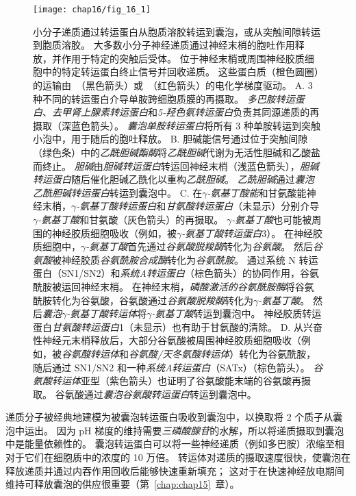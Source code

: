 \begin{figure}[htbp]
	\centering
	\texttt{[image: chap16/fig\_16\_1]}
	\caption{小分子递质通过转运蛋白从胞质溶胶转运到囊泡，或从突触间隙转运到胞质溶胶。
		大多数小分子神经递质通过神经末梢的胞吐作用释放，并作用于特定的突触后受体。
		位于神经末梢或周围神经胶质细胞中的特定转运蛋白终止信号并回收递质。
		这些蛋白质（橙色圆圈）的运输由~（黑色箭头）或~（红色箭头）的电化学梯度驱动\cite{chaudhry2008pharmacology}。
		A. 3 种不同的转运蛋白介导单胺跨细胞质膜的再摄取。
		\textit{多巴胺转运蛋白}、\textit{去甲肾上腺素转运蛋白}和\textit{5-羟色氨转运蛋白}负责其同源递质的再摄取（深蓝色箭头）。
		\textit{囊泡单胺转运蛋白}将所有 3 种单胺转运到突触小泡中，用于随后的胞吐释放。
		B. 胆碱能信号通过位于突触间隙（绿色条）中的\textit{乙酰胆碱酯酶}将\textit{乙酰胆碱}代谢为无活性胆碱和乙酸盐而终止。
		\textit{胆碱}由\textit{胆碱转运蛋白}转运回神经末梢（浅蓝色箭头），\textit{胆碱转运蛋白}随后催化胆碱乙酰化以重构\textit{乙酰胆碱}。
		\textit{乙酰胆碱}通过\textit{囊泡乙酰胆碱转运蛋白}转运到囊泡中。
		C. 在\textit{$\gamma$-氨基丁酸能}和甘氨酸能神经末梢，\textit{$\gamma$-氨基丁酸转运蛋白}和\textit{甘氨酸转运蛋白}（未显示）分别介导\textit{$\gamma$-氨基丁酸}和甘氨酸（灰色箭头）的再摄取。
		\textit{$\gamma$-氨基丁酸}也可能被周围的神经胶质细胞吸收（例如，被\textit{$\gamma$-氨基丁酸转运蛋白}3）。
		在神经胶质细胞中，\textit{$\gamma$-氨基丁酸}首先通过\textit{谷氨酸脱羧酶}转化为\textit{谷氨酸}。
		然后\textit{谷氨酸}被神经胶质\textit{谷氨酰胺合成酶}转化为\textit{谷氨酰胺}。
		通过系统 N 转运蛋白（SN1/SN2）和\textit{系统A转运蛋白}（棕色箭头）的协同作用，谷氨酰胺被运回神经末梢。
		在神经末梢，\textit{磷酸激活的谷氨酰胺酶}将谷氨酰胺转化为谷氨酸，谷氨酸通过\textit{谷氨酸脱羧酶}转化为\textit{$\gamma$-氨基丁酸}。
		然后\textit{囊泡$\gamma$-氨基丁酸转运体}将\textit{$\gamma$-氨基丁酸}转运到囊泡中。
		神经胶质转运蛋白\textit{甘氨酸转运蛋白}1（未显示）也有助于甘氨酸的清除。
		D. 从兴奋性神经元末梢释放后，大部分谷氨酸被周围神经胶质细胞吸收（例如，被\textit{谷氨酸转运体}和\textit{谷氨酸/天冬氨酸转运体}）转化为谷氨酰胺，随后通过 SN1/SN2 和一种\textit{系统A转运蛋白}（SATx）（棕色箭头）。
		\textit{谷氨酸转运体}亚型（紫色箭头）也证明了谷氨酸能末端的谷氨酸再摄取。
		谷氨酸通过\textit{囊泡谷氨酸转运蛋白}转运到囊泡中。}
	\label{fig:16_1}
\end{figure}


递质分子被经典地建模为被囊泡转运蛋白吸收到囊泡中，以换取将 2 个质子从囊泡中运出。
因为 pH 梯度的维持需要\textit{三磷酸腺苷}的水解，所以将递质摄取到囊泡中是能量依赖性的。
囊泡转运蛋白可以将一些神经递质（例如多巴胺）浓缩至相对于它们在细胞质中的浓度的 10 万倍。
转运体对递质的摄取速度很快，使囊泡在释放递质并通过内吞作用回收后能够快速重新填充；
这对于在快速神经放电期间维持可释放囊泡的供应很重要（第~\ref{chap:chap15}~章）。


